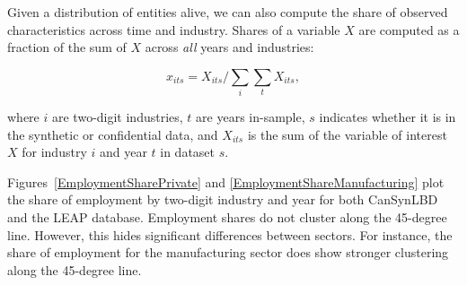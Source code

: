 Given a distribution of entities alive, we can also compute the share of observed characteristics across time and industry. Shares of a variable $X$ are computed as a fraction of the sum of $X$ across \textit{all} years and industries:

\begin{equation}
    \label{eq:share_employment}
x_{its} = X_{its}/\sum_{i} \sum_{t} X_{its}, 
\end{equation}

where $i$ are two-digit industries, $t$ are  years in-sample, $s$ indicates whether it is in the synthetic or confidential data, and $X_{its}$ is the sum of the variable of interest $X$ for industry $i$ and year $t$ in  dataset $s$.

Figures~\ref{EmploymentSharePrivate} and \ref{EmploymentShareManufacturing} plot the share of employment by two-digit industry and year for both  CanSynLBD and the LEAP database. 
Employment shares  do not cluster along the 45-degree line. However, this hides significant differences between sectors. For instance,  the share of employment for the manufacturing sector does show stronger clustering along the 45-degree line.

